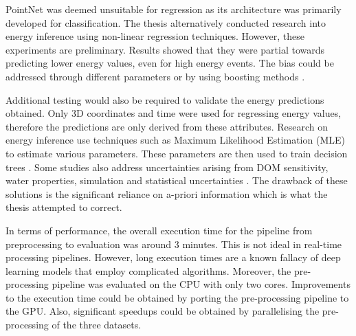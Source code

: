 PointNet was deemed unsuitable for regression as its architecture was primarily developed for classification. The thesis alternatively conducted research into energy inference using non-linear regression techniques. However, these experiments are preliminary. Results showed that they were partial towards predicting lower energy values, even for high energy events. The bias could be addressed through different parameters or by using boosting methods \cite{dietterich1995overfitting}. 

Additional testing would also be required to validate the energy predictions obtained. Only 3D coordinates and time were used for regressing energy values, therefore the predictions are only derived from these attributes. Research on energy inference use techniques such as Maximum Likelihood Estimation (MLE) to estimate various parameters. These parameters are then used to train decision trees \cite{abbasi2011measurement}. Some studies also address uncertainties arising from DOM sensitivity, water properties, simulation and statistical uncertainties \cite{abbasi2011measurement, hieronymus2020reconstruction, d2018flavor}. The drawback of these solutions is the significant reliance on a-priori information which is what the thesis attempted to correct.  

In terms of performance, the overall execution time for the pipeline from preprocessing to evaluation was around 3 minutes. This is not ideal in real-time processing pipelines. However, long execution times are a known fallacy of deep learning models that employ complicated algorithms. Moreover, the pre-processing pipeline was evaluated on the CPU with only two cores. Improvements to the execution time could be obtained by porting the pre-processing pipeline to the GPU. Also, significant speedups could be obtained by parallelising the pre-processing of the three datasets. 